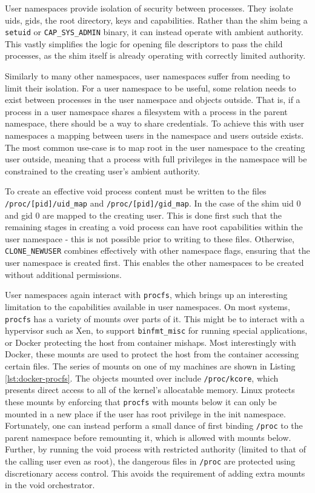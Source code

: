 \documentclass[12pt,a4paper,twoside]{report}
\begin{document}
User namespaces provide isolation of security between processes. They isolate uids, gids, the root directory, keys and capabilities. Rather than the shim being a \texttt{setuid} or \texttt{CAP\_SYS\_ADMIN} binary, it can instead operate with ambient authority. This vastly simplifies the logic for opening file descriptors to pass the child processes, as the shim itself is already operating with correctly limited authority.

Similarly to many other namespaces, user namespaces suffer from needing to limit their isolation. For a user namespace to be useful, some relation needs to exist between processes in the user namespace and objects outside. That is, if a process in a user namespace shares a filesystem with a process in the parent namespace, there should be a way to share credentials. To achieve this with user namespaces a mapping between users in the namespace and users outside exists. The most common use-case is to map root in the user namespace to the creating user outside, meaning that a process with full privileges in the namespace will be constrained to the creating user's ambient authority.

To create an effective void process content must be written to the files \texttt{/proc/[pid]/uid\_map} and \texttt{/proc/[pid]/gid\_map}. In the case of the shim uid 0 and gid 0 are mapped to the creating user. This is done first such that the remaining stages in creating a void process can have root capabilities within the user namespace - this is not possible prior to writing to these files. Otherwise, \texttt{CLONE\_NEWUSER} combines effectively with other namespace flags, ensuring that the user namespace is created first. This enables the other namespaces to be created without additional permissions.

User namespaces again interact with \texttt{procfs}, which brings up an interesting limitation to the capabilities available in user namespaces. On most systems, \texttt{procfs} has a variety of mounts over parts of it. This might be to interact with a hypervisor such as Xen, to support \texttt{binfmt\_misc} for running special applications, or Docker protecting the host from container mishaps. Most interestingly with Docker, these mounts are used to protect the host from the container accessing certain files. The series of mounts on one of my machines are shown in Listing \ref{lst:docker-procfs}. The objects mounted over include \texttt{/proc/kcore}, which presents direct access to all of the kernel's allocatable memory. Linux protects these mounts by enforcing that \texttt{procfs} with mounts below it can only be mounted in a new place if the user has root privilege in the init namespace. Fortunately, one can instead perform a small dance of first binding \texttt{/proc} to the parent namespace before remounting it, which is allowed with mounts below. Further, by running the void process with restricted authority (limited to that of the calling user even as root), the dangerous files in \texttt{/proc} are protected using discretionary access control. This avoids the requirement of adding extra mounts in the void orchestrator.
\end{document}
